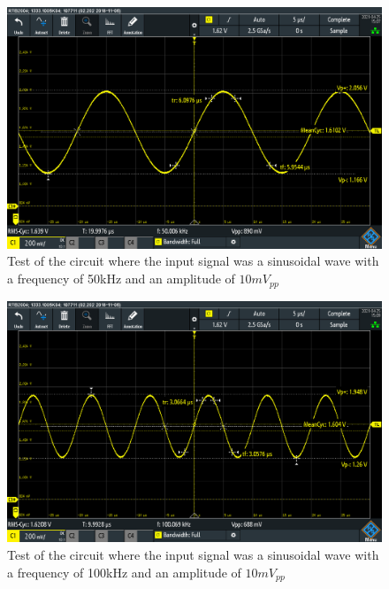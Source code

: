 \begin{figure}[h]
    \centering
    \includegraphics[width=1.0\textwidth]{graphics/50khz.PNG}
    \caption{Test of the circuit where the input signal was a sinusoidal wave with a frequency of 50kHz and an amplitude of $10mV_{pp}$}
    \label{fig:Cir50k}
\end{figure}

\begin{figure}[h]
    \centering
    \includegraphics[width=1.0\textwidth]{graphics/100khz.PNG}
    \caption{Test of the circuit where the input signal was a sinusoidal wave with a frequency of 100kHz and an amplitude of $10mV_{pp}$}
    \label{fig:Cir100k}
\end{figure}



